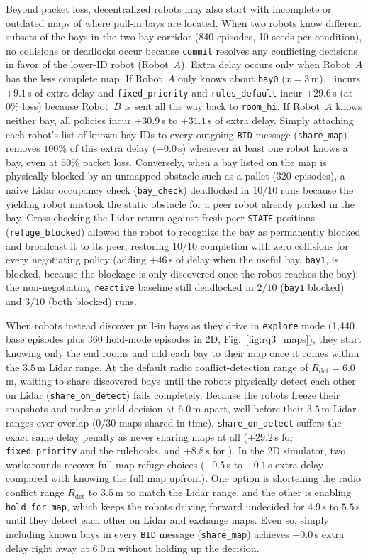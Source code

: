 Beyond packet loss, decentralized robots may also start with incomplete or outdated maps of where pull-in bays are located. When two robots know different subsets of the bays in the two-bay corridor (840 episodes, 10 seeds per condition), no collisions or deadlocks occur because \texttt{commit} resolves any conflicting decisions in favor of the lower-ID robot (Robot~$A$). Extra delay occurs only when Robot~$A$ has the less complete map. If Robot~$A$ only knows about \texttt{bay0} ($x=3$\,m), \cb\ incurs $+9.1$\,s of extra delay and \texttt{fixed\_priority} and \texttt{rules\_default} incur $+29.6$\,s (at $0\%$ loss) because Robot~$B$ is sent all the way back to \texttt{room\_hi}. If Robot~$A$ knows neither bay, all policies incur $+30.9$\,s to $+31.1$\,s of extra delay. Simply attaching each robot's list of known bay IDs to every outgoing \texttt{BID} message (\texttt{share\_map}) removes $100\%$ of this extra delay ($+0.0$\,s) whenever at least one robot knows a bay, even at $50\%$ packet loss. Conversely, when a bay listed on the map is physically blocked by an unmapped obstacle such as a pallet (320 episodes), a naive Lidar occupancy check (\texttt{bay\_check}) deadlocked in $10/10$ runs because the yielding robot mistook the static obstacle for a peer robot already parked in the bay. Cross-checking the Lidar return against fresh peer \texttt{STATE} positions (\texttt{refuge\_blocked}) allowed the robot to recognize the bay as permanently blocked and broadcast it to its peer, restoring $10/10$ completion with zero collisions for every negotiating policy (adding $+46$\,s of delay when the useful bay, \texttt{bay1}, is blocked, because the blockage is only discovered once the robot reaches the bay); the non-negotiating \texttt{reactive} baseline still deadlocked in $2/10$ (\texttt{bay1} blocked) and $3/10$ (both blocked) runs.

When robots instead discover pull-in bays as they drive in \texttt{explore} mode (1,440 base episodes plus 360 hold-mode episodes in 2D, Fig.~\ref{fig:rq3_maps}), they start knowing only the end rooms and add each bay to their map once it comes within the $3.5$\,m Lidar range. At the default radio conflict-detection range of $R_{\mathrm{det}}=6.0$\,m, waiting to share discovered bays until the robots physically detect each other on Lidar (\texttt{share\_on\_detect}) fails completely. Because the robots freeze their snapshots and make a yield decision at $6.0$\,m apart, well before their $3.5$\,m Lidar ranges ever overlap ($0/30$ maps shared in time), \texttt{share\_on\_detect} suffers the exact same delay penalty as never sharing maps at all ($+29.2$\,s for \texttt{fixed\_priority} and the rulebooks, and $+8.8$\,s for \cb). In the 2D simulator, two workarounds recover full-map refuge choices ($-0.5$\,s to $+0.1$\,s extra delay compared with knowing the full map upfront). One option is shortening the radio conflict range $R_{\mathrm{det}}$ to $3.5$\,m to match the Lidar range, and the other is enabling \texttt{hold\_for\_map}, which keeps the robots driving forward undecided for $4.9$\,s to $5.5$\,s until they detect each other on Lidar and exchange maps. Even so, simply including known bays in every \texttt{BID} message (\texttt{share\_map}) achieves $+0.0$\,s extra delay right away at $6.0$\,m without holding up the decision.

